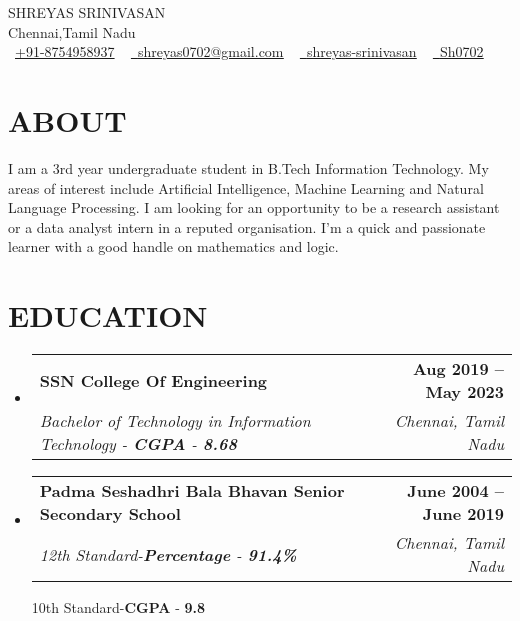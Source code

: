\documentclass[letterpaper,11pt]{article}
\makeatletter
\newcommand{\resumeSubheading}[4]{
  \vspace{-2pt}\item
    \begin{tabular*}{1.0\textwidth}[t]{l@{\extracolsep{\fill}}r}
      \textbf{\large#1} & \textbf{\small #2} \\
      \textit{\large#3} & \textit{\small #4} \\
      
    \end{tabular*}\vspace{-7pt}
}
\newcommand{\resumeSubHeadingListStart}{\begin{itemize}[leftmargin=0.0in, label={}]}
\newcommand{\resumeSubHeadingListEnd}{\end{itemize}}
\makeatother
\begin{document}


\begin{center}
    {\Huge \scshape SHREYAS SRINIVASAN} \\ \vspace{1pt}
    Chennai,Tamil Nadu \\ \vspace{1pt}
    \small { \raisebox{-0.1\height}\faPhone\ \underline{+91-8754958937} ~} \href{mailto:shreyas0702@gmail.com}{\raisebox{-0.2\height}\faEnvelope\  \underline{shreyas0702@gmail.com}} ~ 
    \href{https://linkedin.com/in/shreyas-srinivasan-1b002b205}{\raisebox{-0.2\height}\faLinkedinSquare\ \underline{shreyas-srinivasan}}  ~
    \href{https://github.com/Sh0702}{\raisebox{-0.2\height}\faGithub\ \underline{Sh0702}} ~
\end{center}

\section{ABOUT}
    I am a 3rd year undergraduate student in B.Tech Information Technology. My areas of interest include Artificial Intelligence, Machine Learning and Natural Language Processing. I am looking for an opportunity to be a research assistant or a data analyst intern in a reputed organisation. I'm a quick and passionate learner with a good handle on mathematics and logic.


\section{EDUCATION}
  \resumeSubHeadingListStart
    \resumeSubheading
      {SSN College Of Engineering}{Aug 2019 -- May 2023}
      {Bachelor of Technology in Information Technology - \textbf{CGPA} - \textbf{8.68}}{Chennai, Tamil Nadu}
  \resumeSubHeadingListEnd
  
  \resumeSubHeadingListStart
    \resumeSubheading
      {Padma Seshadhri Bala Bhavan Senior Secondary School}{June 2004 -- June 2019}
      {12th Standard-\textbf{Percentage} - \textbf{91.4\%}}{Chennai, Tamil Nadu}
      \linebreak
      {10th Standard-\textbf{CGPA} - \textbf{9.8}}
  \resumeSubHeadingListEnd
\end{document}
